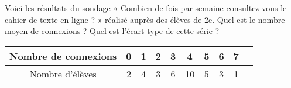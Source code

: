 
Voici les résultats du sondage « Combien de fois par semaine consultez-vous le cahier de texte en ligne ? » réalisé auprès des élèves de 2e.
Quel est le nombre moyen de connexions ? Quel est l'écart type de cette série ?


\begin{tabular}{|c|c|c|c|c|c|c|c|c|c|}
\hline 
Nombre de connexions & 0 & 1 & 2 & 3 & 4 & 5 & 6 & 7  \\ 
\hline 
Nombre d'élèves & 2 & 4 & 3 & 6 & 10 & 5 & 3 & 1  \\ 
\hline 
\end{tabular} 
 